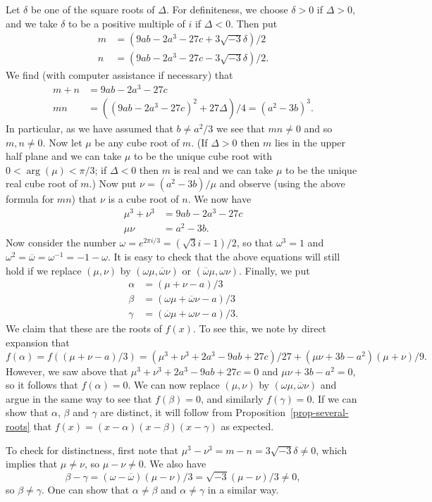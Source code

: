 \documentclass{amsart}
\newcommand{\al}        {\alpha}
\newcommand{\bt}        {\beta}
\newcommand{\gm}        {\gamma}
\newcommand{\dl}        {\delta}
\newcommand{\om}        {\omega}
\newcommand{\ob}        {\overline{\omega}}
\newcommand{\Dl}        {\Delta}
\newcommand{\ov}[1]     {\overline{#1}}
\renewcommand{\:}{\colon}
\theoremstyle{definition}
\begin{document}
Let $\dl$ be one of the square roots of $\Dl$.  For definiteness, we
choose $\dl>0$ if $\Dl>0$, and we take $\dl$ to be a positive multiple
of $i$ if $\Dl<0$.  Then put
\begin{align*}
 m &= (9ab - 2a^3 - 27c + 3\sqrt{-3}\delta)/2 \\
 n &= (9ab - 2a^3 - 27c - 3\sqrt{-3}\delta)/2.
\end{align*}
We find (with computer assistance if necessary) that 
\begin{align*}
 m+n &= 9ab-2a^3-27c \\
 mn &= ((9ab-2a^3-27c)^2+27\Dl)/4 = (a^2-3b)^3.
\end{align*}
In particular, as we have assumed that $b\neq a^2/3$ we see that
$mn\neq 0$ and so $m,n\neq 0$.  Now let $\mu$ be any cube root of $m$.
(If $\Dl>0$ then $m$ lies in the upper half plane and we can take
$\mu$ to be the unique cube root with $0<\arg(\mu)<\pi/3$; if $\Dl<0$
then $m$ is real and we can take $\mu$ to be the unique real cube root
of $m$.)  Now put $\nu=(a^2-3b)/\mu$ and observe (using the above
formula for $mn$) that $\nu$ is a cube root of $n$.  We now have
\begin{align*}
 \mu^3+\nu^3 &= 9ab-2a^3-27c \\
 \mu\nu &= a^2-3b.
\end{align*}
Now consider the number $\om=e^{2\pi i/3}=(\sqrt{3}i-1)/2$, so that
$\om^3=1$ and $\om^2=\ov{\om}=\om^{-1}=-1-\om$.  It is easy to check
that the above equations will still hold if we replace $(\mu,\nu)$ by
$(\om\mu,\ob\nu)$ or $(\ob\mu,\om\nu)$.  Finally, we put 
\begin{align*}
 \al &= (\mu+\nu-a)/3 \\
 \bt &= (\om\mu+\ob\nu-a)/3 \\
 \gm &= (\ob\mu+\om\nu-a)/3.
\end{align*}
We claim that these are the roots of $f(x)$.  To see this, we note by
direct expansion that 
\[ f(\al) = f((\mu+\nu-a)/3) = 
    (\mu^3+\nu^3+2a^3-9ab+27c)/27 + (\mu\nu+3b-a^2)(\mu+\nu)/9.
\]
However, we saw above that $\mu^3+\nu^3+2a^3-9ab+27c=0$ and
$\mu\nu+3b-a^2=0$, so it follows that $f(\al)=0$.  We can now replace
$(\mu,\nu)$ by $(\om\mu,\ob\nu)$ and argue in the same way to see that
$f(\bt)=0$, and similarly $f(\gm)=0$.  If we can show that $\al$,
$\bt$ and $\gm$ are distinct, it will follow from
Proposition~\ref{prop-several-roots} that $f(x)=(x-\al)(x-\bt)(x-\gm)$
as expected.

To check for distinctness, first note that
$\mu^3-\nu^3=m-n=3\sqrt{-3}\dl\neq 0$, which implies that
$\mu\neq\nu$, so $\mu-\nu\neq 0$.  We also have 
\[ \bt-\gm = (\om-\ob)(\mu-\nu)/3 = 
    \sqrt{-3}(\mu-\nu)/3 \neq 0, 
\]
so $\bt\neq\gm$.  One can show that $\al\neq\bt$ and $\al\neq\gm$ in a
similar way.
\end{document}
